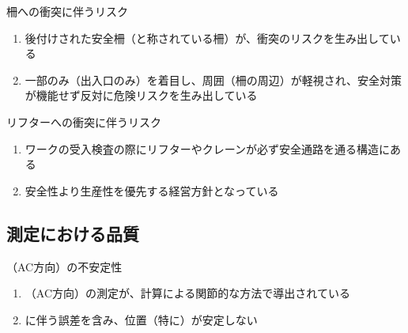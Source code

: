 \begin{Issues}{柵への衝突に伴うリスク}
\begin{enumerate}[label=\sarrow]
\item 後付けされた安全柵（と称されている柵）が、衝突のリスクを生み出している
\item 一部のみ（出入口のみ）を着目し、周囲（柵の周辺）が軽視され、安全対策が機能せず反対に危険リスクを生み出している
\end{enumerate}
\end{Issues}

\begin{Issues}{リフターへの衝突に伴うリスク}
\begin{enumerate}[label=\sarrow]
\item ワークの受入検査の際にリフターやクレーンが必ず安全通路を通る構造にある
\item 安全性より生産性を優先する経営方針となっている
\end{enumerate}
\end{Issues}


\clearpage


\subsection{測定における品質}

\begin{Issues}{\KeywayCenterMeasurement（AC方向）の不安定性}
\begin{enumerate}[label=\sarrow]
\item[{\sarrow[red]}]\KeywayCenter（AC方向）の測定が、計算による関節的な方法で導出されている
\item[{\sarrow[red]}]\CenterCurvature に伴う誤差を含み、位置（特に\AsideKeywayDepth）が安定しない
\end{enumerate}
\end{Issues}

